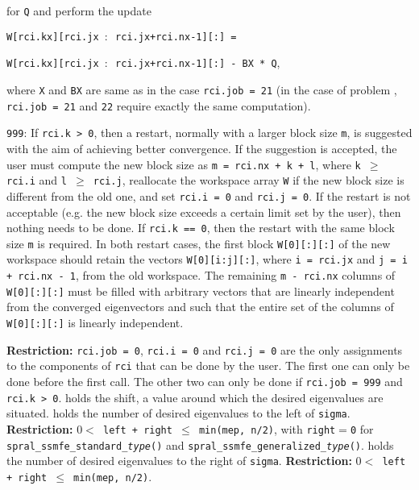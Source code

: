 \begin{description}
\begin{description}
for {\tt Q}  and perform the update

\hspace{8mm}
{\tt W[rci.kx][rci.jx $:$ rci.jx+rci.nx-1][:] =}

\hspace{12mm}
{\tt W[rci.kx][rci.jx $:$ rci.jx+rci.nx-1][:] - BX * Q},

where {\tt X} and {\tt BX} are same as in 
the case {\tt rci.job = 21}
(in the case of problem ,
{\tt rci.job = 21} and {\tt 22} 
require exactly the same computation).
%
\item
{\tt 999}: 
If {\tt rci.k > 0}, then
a restart, normally with a larger block size {\tt m},
is suggested with the aim of achieving better convergence.
If the suggestion is accepted, the user must compute
the new block size as {\tt m = rci.nx + k + l},
where {\tt k $\ge$ rci.i} and {\tt l $\ge$ rci.j},
reallocate the workspace array {\tt W}
if the new block size is different from the old one,
and set {\tt rci.i = 0} and {\tt rci.j = 0}.
If the restart is not acceptable
(e.g. the new block size exceeds a certain limit set by the user), 
then nothing needs to be done.
If {\tt rci.k == 0}, then
the restart with the same block size {\tt m} is required.
In both restart cases,
the first block {\tt W[0][:][:]} of the new
workspace should retain the vectors 
{\tt W[0][i:j][:]},
where {\tt i = rci.jx} and {\tt j = i + rci.nx - 1},
from the old workspace.
The remaining {\tt m - rci.nx} columns of {\tt W[0][:][:]}
must be filled
with arbitrary vectors that are linearly independent from 
the converged eigenvectors and such that
the entire set of the columns of {\tt W[0][:][:]}
is linearly independent.
%
\end{description}
%
{\bf Restriction:} 
{\tt rci.job = 0}, 
{\tt rci.i = 0} and
{\tt rci.j = 0} 
are the only %
assignments to the components of {\tt rci}
that can be done
by the user.
The first one can only be done before the first call.
The other two can only be done if
{\tt rci.job = 999} and {\tt rci.k > 0}.
%
 holds the shift, 
a value around which the desired eigenvalues
are situated.
%
 holds the number of desired eigenvalues to the left of {\tt sigma}.
{\bf Restriction:} {\tt $0 < $ left + right $\le$ min(mep, n/2)},
with {\tt right}$=${\tt 0} for {\tt spral\_ssmfe\_standard\_\textit{type}()} and
{\tt spral\_ssmfe\_generalized\_\textit{type}()}.
%
 holds the number of desired eigenvalues to the right of {\tt sigma}.
{\bf Restriction:} {\tt $0 < $ left + right $\le$ min(mep, n/2)}.

\end{description}
